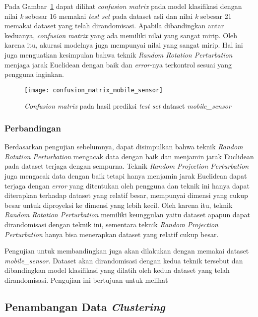 Pada Gambar~\ref{fig:confusion_matrix_mobile_sensor} dapat dilihat \textit{confusion matrix} pada model klasifikasi dengan nilai \textit{k} sebesar 16 memakai \textit{test set} pada dataset asli dan nilai \textit{k} sebesar 21 memakai dataset yang telah dirandomisasi. Apabila dibandingkan antar keduanya, \textit{confusion matrix} yang ada memiliki nilai yang sangat mirip. Oleh karena itu, akurasi modelnya juga mempunyai nilai yang sangat mirip. Hal ini juga menguatkan kesimpulan bahwa teknik \textit{Random Rotation Perturbation} menjaga jarak Euclidean dengan baik dan \textit{error}-nya terkontrol sesuai yang pengguna inginkan.

\begin{figure}
	\centering
	\texttt{[image: confusion\_matrix\_mobile\_sensor]}
	\caption{\textit{Confusion matrix} pada hasil prediksi \textit{test set} dataset \textit{mobile\_sensor}}
	\label{fig:confusion_matrix_mobile_sensor}
\end{figure}

\subsubsection{Perbandingan}
\label{sec:pengujian-klasifikasi-perbandingan}

Berdasarkan pengujian sebelumnya, dapat disimpulkan bahwa teknik \textit{Random Rotation Perturbation} mengacak data dengan baik dan menjamin jarak Euclidean pada dataset terjaga dengan sempurna. Teknik \textit{Random Projection Perturbation} juga mengacak data dengan baik tetapi hanya menjamin jarak Euclidean dapat terjaga dengan \textit{error} yang ditentukan oleh pengguna dan teknik ini hanya dapat diterapkan terhadap dataset yang relatif besar, mempunyai dimensi yang cukup besar untuk diproyeksi ke dimensi yang lebih kecil. Oleh karena itu, teknik \textit{Random Rotation Perturbation} memiliki keunggulan yaitu dataset apapun dapat dirandomisasi dengan teknik ini, sementara teknik \textit{Random Projection Perturbation} hanya bisa menerapkan dataset yang relatif cukup besar.

Pengujian untuk membandingkan juga akan dilakukan dengan memakai dataset \textit{mobile\_sensor}. Dataset akan dirandomisasi dengan kedua teknik tersebut dan dibandingkan model klasifikasi yang dilatih oleh kedua dataset yang telah dirandomisasi. Pengujian ini bertujuan untuk melihat 

\subsection{Penambangan Data \textit{Clustering}}
\label{sec:pengujian-clustering}

